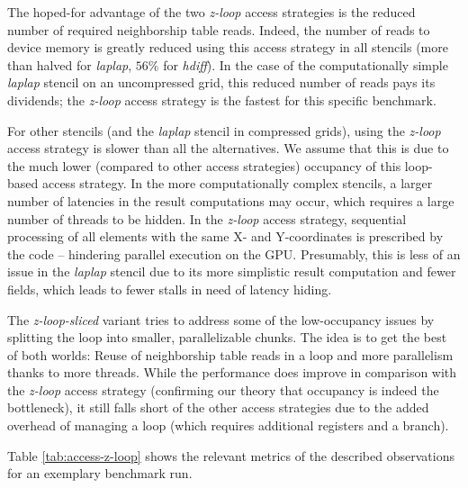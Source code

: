 The hoped-for advantage of the two \emph{z-loop} access strategies is the reduced number of required neighborship table reads. Indeed, the number of reads to device memory is greatly reduced using this access strategy in all stencils (more than halved for \emph{laplap}, $56\%$ for \emph{hdiff}). In the case of the computationally simple \emph{laplap} stencil on an uncompressed grid, this reduced number of reads pays its dividends; the \emph{z-loop} access strategy is the fastest for this specific benchmark.

For other stencils (and the \emph{laplap} stencil in compressed grids), using the \emph{z-loop} access strategy is slower than all the alternatives.  We assume that this is due to the much lower (compared to other access strategies) occupancy of this loop-based access strategy. In the more computationally complex stencils, a larger number of latencies in the result computations may occur, which requires a large number of threads to be hidden. In the \emph{z-loop} access strategy, sequential processing of all elements with the same X- and Y-coordinates is prescribed by the code -- hindering parallel execution on the GPU. Presumably, this is less of an issue in the \emph{laplap} stencil due to its more simplistic result computation and fewer fields, which leads to fewer stalls in need of latency hiding.

The \emph{z-loop-sliced} variant tries to address some of the low-occupancy issues by splitting the loop into smaller, parallelizable chunks. The idea is to get the best of both worlds: Reuse of neighborship table reads in a loop and more parallelism thanks to more threads. While the performance does improve in comparison with the \emph{z-loop} access strategy (confirming our theory that occupancy is indeed the bottleneck), it still falls short of the other access strategies due to the added overhead of managing a loop (which requires additional registers and a branch).

Table \ref{tab:access-z-loop} shows the relevant metrics of the described observations for an exemplary benchmark run.



